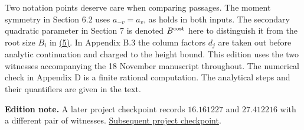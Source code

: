\documentclass[11pt,a4paper]{article}
\begin{document}
Two notation points deserve care when comparing passages. The moment symmetry in Section 6.2 uses \(a_{-v}=a_v\), as holds in both inputs. The secondary quadratic parameter in Section 7 is denoted \(B^{\rm cost}\) here to distinguish it from the root size \(B_i\) in \hyperref[eq:5]{(5)}. In Appendix B.3 the column factors \(d_j\) are taken out before analytic continuation and charged to the height bound. This edition uses the two witnesses accompanying the 18 November manuscript throughout. The numerical check in Appendix D is a finite rational computation. The analytical steps and their quantifiers are given in the text.

\textbf{Edition note.} A later project checkpoint records \(16.161227\) and \(27.412216\) with a different pair of witnesses. \href{../../../research/pi_cross_constant_2026-11-18/CHECKPOINT.md}{Subsequent project checkpoint}.
\end{document}
